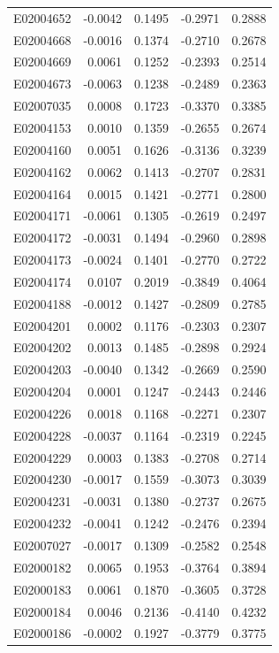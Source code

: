 \documentclass[11pt, a4paper]{article}
\begin{document}
\begin{longtable}{lrrrr}
E02004652 & -0.0042 & 0.1495 & -0.2971 & 0.2888 \\
E02004668 & -0.0016 & 0.1374 & -0.2710 & 0.2678 \\
E02004669 & 0.0061 & 0.1252 & -0.2393 & 0.2514 \\
E02004673 & -0.0063 & 0.1238 & -0.2489 & 0.2363 \\
E02007035 & 0.0008 & 0.1723 & -0.3370 & 0.3385 \\
E02004153 & 0.0010 & 0.1359 & -0.2655 & 0.2674 \\
E02004160 & 0.0051 & 0.1626 & -0.3136 & 0.3239 \\
E02004162 & 0.0062 & 0.1413 & -0.2707 & 0.2831 \\
E02004164 & 0.0015 & 0.1421 & -0.2771 & 0.2800 \\
E02004171 & -0.0061 & 0.1305 & -0.2619 & 0.2497 \\
E02004172 & -0.0031 & 0.1494 & -0.2960 & 0.2898 \\
E02004173 & -0.0024 & 0.1401 & -0.2770 & 0.2722 \\
E02004174 & 0.0107 & 0.2019 & -0.3849 & 0.4064 \\
E02004188 & -0.0012 & 0.1427 & -0.2809 & 0.2785 \\
E02004201 & 0.0002 & 0.1176 & -0.2303 & 0.2307 \\
E02004202 & 0.0013 & 0.1485 & -0.2898 & 0.2924 \\
E02004203 & -0.0040 & 0.1342 & -0.2669 & 0.2590 \\
E02004204 & 0.0001 & 0.1247 & -0.2443 & 0.2446 \\
E02004226 & 0.0018 & 0.1168 & -0.2271 & 0.2307 \\
E02004228 & -0.0037 & 0.1164 & -0.2319 & 0.2245 \\
E02004229 & 0.0003 & 0.1383 & -0.2708 & 0.2714 \\
E02004230 & -0.0017 & 0.1559 & -0.3073 & 0.3039 \\
E02004231 & -0.0031 & 0.1380 & -0.2737 & 0.2675 \\
E02004232 & -0.0041 & 0.1242 & -0.2476 & 0.2394 \\
E02007027 & -0.0017 & 0.1309 & -0.2582 & 0.2548 \\
E02000182 & 0.0065 & 0.1953 & -0.3764 & 0.3894 \\
E02000183 & 0.0061 & 0.1870 & -0.3605 & 0.3728 \\
E02000184 & 0.0046 & 0.2136 & -0.4140 & 0.4232 \\
E02000186 & -0.0002 & 0.1927 & -0.3779 & 0.3775 \\

\end{longtable}
\end{document}
